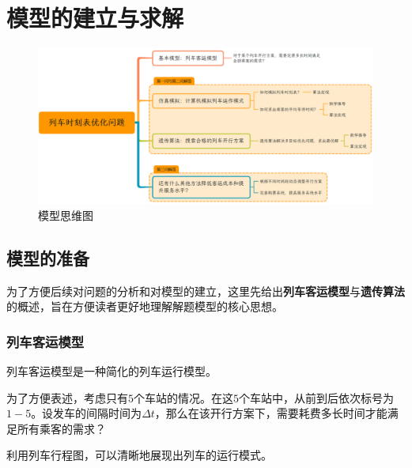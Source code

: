 %
%

\section{模型的建立与求解}

\begin{figure}[h]
    \centering
    \includegraphics[scale=0.2]{res/figure161100.png}
    \caption{模型思维图}
\end{figure}


\subsection{模型的准备}

为了方便后续对问题的分析和对模型的建立，这里先给出\textbf{列车客运模型}与\textbf{遗传算法}的概述，旨在方便读者更好地理解解题模型的核心思想。

\subsubsection{列车客运模型}

列车客运模型是一种简化的列车运行模型。

为了方便表述，考虑只有$5$个车站的情况。在这$5$个车站中，从前到后依次标号为$1-5$。设发车的间隔时间为$\Delta t$，那么在该开行方案下，需要耗费多长时间才能满足所有乘客的需求？

利用列车行程图，可以清晰地展现出列车的运行模式。

